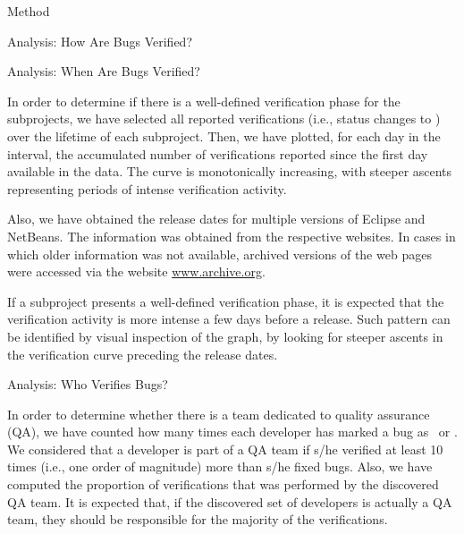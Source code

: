 \begin{section}{Method}
\begin{subsection}{Analysis: How Are Bugs Verified?}
\end{subsection}

\begin{subsection}{Analysis: When Are Bugs Verified?}
	
	In order to determine if there is a well-defined verification phase for the subprojects, we have selected all reported verifications (i.e., status changes to \VERIFIED) over the lifetime of each subproject. Then, we have plotted, for each day in the interval, the accumulated number of verifications reported since the first day available in the data. The curve is monotonically increasing, with steeper ascents representing periods of intense verification activity.
	
	Also, we have obtained the release dates for multiple versions of Eclipse and NetBeans. The information was obtained from the respective websites. In cases in which older information was not available, archived versions of the web pages were accessed via the website \url{www.archive.org}.
	
	If a subproject presents a well-defined verification phase, it is expected that the verification activity is more intense a few days before a release. Such pattern can be identified by visual inspection of the graph, by looking for steeper ascents in the verification curve preceding the release dates.
	
\end{subsection}

\begin{subsection}{Analysis: Who Verifies Bugs?}
	
	In order to determine whether there is a team dedicated to quality assurance (QA), we have counted how many times each developer has marked a bug as \FIXED\ or \VERIFIED. We considered that a developer is part of a QA team if s/he verified at least 10 times (i.e., one order of magnitude) more than s/he fixed bugs. Also, we have computed the proportion of verifications that was performed by the discovered QA team. It is expected that, if the discovered set of developers is actually a QA team, they should be responsible for the majority of the verifications.
	
\end{subsection}

\end{section}

